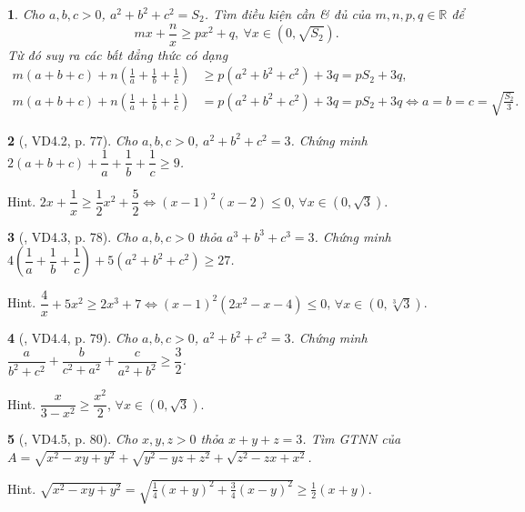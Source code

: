 \documentclass{article}
\newtheorem{baitoan}{}
\begin{document}
\begin{baitoan}
	Cho $a,b,c > 0$, $a^2 + b^2 + c^2 = S_2$. Tìm điều kiện cần \& đủ của $m,n,p,q\in\mathbb{R}$ để
	\begin{equation*}
		mx + \frac{n}{x}\ge px^2 + q,\ \forall x\in(0,\sqrt{S_2}).
	\end{equation*}
	Từ đó suy ra các bất đẳng thức có dạng
	\begin{align*}
		m(a + b + c) + n\left(\frac{1}{a} + \frac{1}{b} + \frac{1}{c}\right)&\ge p(a^2 + b^2 + c^2) + 3q = pS_2 + 3q,\\
		m(a + b + c) + n\left(\frac{1}{a} + \frac{1}{b} + \frac{1}{c}\right) &= p(a^2 + b^2 + c^2) + 3q = pS_2 + 3q\Leftrightarrow a = b = c = \sqrt{\frac{S_2}{3}}.
	\end{align*}
\end{baitoan}

\begin{baitoan}[\cite{Son_Nghiep_Trung_Can_bdt}, VD4.2, p. 77]
	Cho $a,b,c > 0$, $a^2 + b^2 + c^2 = 3$. Chứng minh $2(a + b + c) + \dfrac{1}{a} + \dfrac{1}{b} + \dfrac{1}{c}\ge9$.
\end{baitoan}
{\sf Hint.} $2x + \dfrac{1}{x}\ge\dfrac{1}{2}x^2 + \dfrac{5}{2}\Leftrightarrow(x - 1)^2(x - 2)\le0$, $\forall x\in(0,\sqrt{3})$.

\begin{baitoan}[\cite{Son_Nghiep_Trung_Can_bdt}, VD4.3, p. 78]
	Cho $a,b,c > 0$ thỏa $a^3 + b^3 + c^3 = 3$. Chứng minh $4\left(\dfrac{1}{a} + \dfrac{1}{b} + \dfrac{1}{c}\right) + 5(a^2 + b^2 + c^2)\ge27$.
\end{baitoan}
{\sf Hint.} $\dfrac{4}{x} + 5x^2\ge2x^3 + 7\Leftrightarrow(x - 1)^2(2x^2 - x - 4)\le0$, $\forall x\in(0,\sqrt[3]{3})$.

\begin{baitoan}[\cite{Son_Nghiep_Trung_Can_bdt}, VD4.4, p. 79]
	Cho $a,b,c > 0$, $a^2 + b^2 + c^2 = 3$. Chứng minh $\dfrac{a}{b^2 + c^2} + \dfrac{b}{c^2 + a^2} + \dfrac{c}{a^2 + b^2}\ge\dfrac{3}{2}$.
\end{baitoan}
{\sf Hint.} $\dfrac{x}{3 - x^2}\ge\dfrac{x^2}{2}$, $\forall x\in(0,\sqrt{3})$.

\begin{baitoan}[\cite{Son_Nghiep_Trung_Can_bdt}, VD4.5, p. 80]
	Cho $x,y,z > 0$ thỏa $x + y + z = 3$. Tìm {\rm GTNN} của $A = \sqrt{x^2- xy + y^2} + \sqrt{y^2 - yz + z^2} + \sqrt{z^2 - zx + x^2}$.
\end{baitoan}
{\sf Hint.} $\sqrt{x^2- xy + y^2} = \sqrt{\frac{1}{4}(x + y)^2 + \frac{3}{4}(x - y)^2}\ge\frac{1}{2}(x + y)$.
\end{document}
